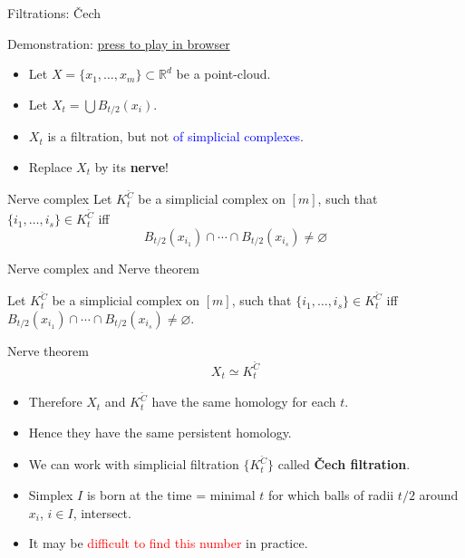\documentclass[10pt,xcolor={usenames}]{beamer}
\newcommand{\Ro}{\mathbb{R}}
\begin{document}
\begin{frame}{Filtrations: \v{C}ech}

Demonstration: \href{https://play.unity.com/mg/other/builds-4z-1}{press to play in browser}
\pause

\begin{itemize}
  \item Let $X=\{x_1,\ldots,x_m\}\subset \Ro^d$ be a point-cloud.
  \item Let $X_t=\bigcup B_{t/2}(x_i)$.
  \item $X_t$ is a filtration, but not \textcolor{blue}{of simplicial complexes}.\pause
  \item Replace $X_t$ by its \textbf{nerve}!
\end{itemize}

\begin{block}{Nerve complex}
Let $K^{\check{C}}_t$ be a simplicial complex on $[m]$, such that $\{i_1,\ldots,i_s\}\in K^{\check{C}}_t$ iff
\[
B_{t/2}(x_{i_1})\cap\cdots\cap B_{t/2}(x_{i_s})\neq\varnothing
\]
\end{block}

\end{frame}

\begin{frame}{Nerve complex and Nerve theorem}

Let $K^{\check{C}}_t$ be a simplicial complex on $[m]$, such that $\{i_1,\ldots,i_s\}\in K^{\check{C}}_t$ iff $B_{t/2}(x_{i_1})\cap\cdots\cap B_{t/2}(x_{i_s})\neq\varnothing$.

\begin{block}{Nerve theorem}
\[
X_t\simeq K^{\check{C}}_t
\]
\end{block}

\pause
\begin{itemize}
  \item Therefore $X_t$ and $K^{\check{C}}_t$ have the same homology for each $t$.
  \item Hence they have the same persistent homology.
  \item We can work with simplicial filtration $\{K^{\check{C}}_t\}$ called \textbf{\v{C}ech filtration}. \pause
  \item Simplex $I$ is born at the time = minimal $t$ for which balls of radii $t/2$ around $x_i$, $i\in I$, intersect.\pause
  \item It may be \textcolor{red}{difficult to find this number} in practice.
\end{itemize}

\end{frame}
\end{document}
